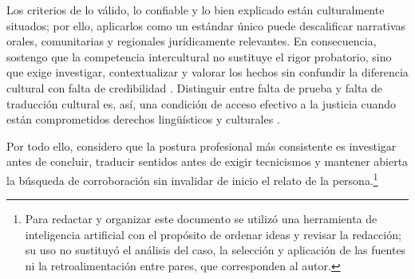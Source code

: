 \documentclass[
  spanish,
  letterpaper, oneside
]{article}
\begin{document}
Los criterios de lo válido, lo confiable y lo bien explicado están culturalmente
situados; por ello, aplicarlos como un estándar único puede descalificar narrativas
orales, comunitarias y regionales jurídicamente relevantes. En consecuencia, sostengo
que la competencia intercultural no sustituye el rigor probatorio, sino que exige
investigar, contextualizar y valorar los hechos sin confundir la diferencia cultural
con falta de credibilidad \citep{scjn2022protocolo}. Distinguir entre falta de prueba
y falta de traducción cultural es, así, una condición de acceso efectivo a la
justicia cuando están comprometidos derechos lingüísticos y culturales
\citep{cpeum2026,leyDerechosLinguisticos2024}.

Por todo ello, considero que la postura profesional más consistente es investigar
antes de concluir, traducir sentidos antes de exigir tecnicismos y mantener abierta la
búsqueda de corroboración sin invalidar de inicio el relato de la
persona.\footnote{Para redactar y organizar este documento se utilizó una
herramienta de inteligencia artificial con el propósito de ordenar ideas y revisar
la redacción; su uso no sustituyó el análisis del caso, la selección y aplicación de
las fuentes ni la retroalimentación entre pares, que corresponden al autor.}

\clearpage
\nocite{bertely2011interaprendizajes,pech2016manual,scjn2022protocolo,diazAlonso2011construccion,cpeum2026,leyDerechosLinguisticos2024,oit1691989,unescoInterculturalCompetences2013}

\end{document}
